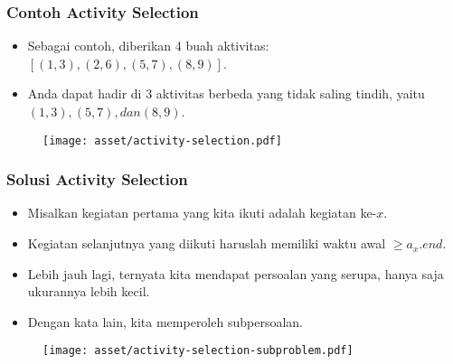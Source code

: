 \begin{frame}
  \frametitle{Contoh Activity Selection}
  \begin{itemize}
    \item Sebagai contoh, diberikan 4 buah aktivitas: $[ (1, 3) , (2, 6), (5, 7),  (8, 9) ]$. \item Anda dapat hadir di 3 aktivitas berbeda yang tidak saling tindih, yaitu $(1, 3), (5, 7), dan (8, 9)$.
  \end{itemize}

  \begin{figure}
    \texttt{[image: asset/activity-selection.pdf]}
  \end{figure}
\end{frame}

\begin{frame}
  \frametitle{Solusi Activity Selection}
  \begin{itemize}
    \item Misalkan kegiatan pertama yang kita ikuti adalah kegiatan ke-$x$.
    \item Kegiatan selanjutnya yang diikuti haruslah memiliki waktu awal $\geq a_x.end$.
    \item Lebih jauh lagi, ternyata kita mendapat persoalan yang serupa, hanya saja ukurannya lebih kecil.
    \item Dengan kata lain, kita memperoleh subpersoalan.
  \end{itemize}

  \begin{figure}
    \texttt{[image: asset/activity-selection-subproblem.pdf]}
  \end{figure}
\end{frame}

